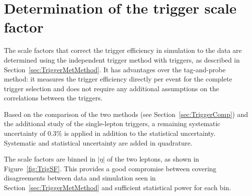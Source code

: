 \section{Determination of the trigger scale factor}

\label{sec:TrigSF}

The scale factors that correct the trigger efficiency in simulation to the data are determined using the independent trigger method with \ETm triggers, as described in Section~\ref{sec:TriggerMetMethod}. 
It has advantages over the tag-and-probe method: it measures the trigger efficiency directly per event for the complete trigger selection and does not require any additional assumptions on the correlations between the triggers.

Based on the comparison of the two methods (see Section~\ref{sec:TriggerComp}) and the additional study of the single-lepton triggers, a remaining systematic uncertainty of $0.3\%$ is applied in addition to the statistical uncertainty.
Systematic and statistical uncertainty are added in quadrature. 

The scale factors are binned in $|\eta|$ of the two leptons, as shown in Figure~\ref{fig:TrigSF}. This provides a good compromise between covering disagreements between data and simulation seen in Section~\ref{sec:TriggerMetMethod} and sufficient statistical power for each bin.



